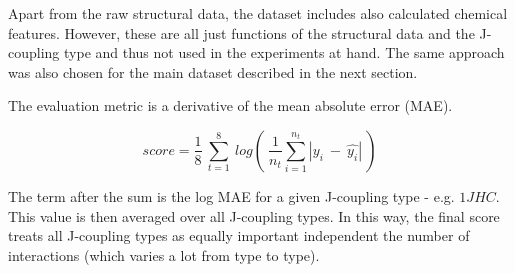 Apart from the raw structural data, the dataset includes also calculated chemical features. However, these are all just functions of the structural data and the J-coupling type and thus not used in the experiments at hand. The same approach was also chosen for the main dataset described in the next section.

The evaluation metric is a derivative of the mean absolute error (MAE).

\begin{equation}\label{eq:champs-score}
	score = \frac{1}{8} ~ \sum_{t=1}^{8} ~ log(~\frac{1}{n_t} \sum_{i=1}^{n_t}|y_i~-~\hat{y_i}| ~)
\end{equation}

The term after the sum is the log MAE for a given J-coupling type - e.g. $1JHC$. This value is then averaged over all J-coupling types. In this way, the final score treats all J-coupling types as equally important independent the number of interactions (which varies a lot from type to type).

